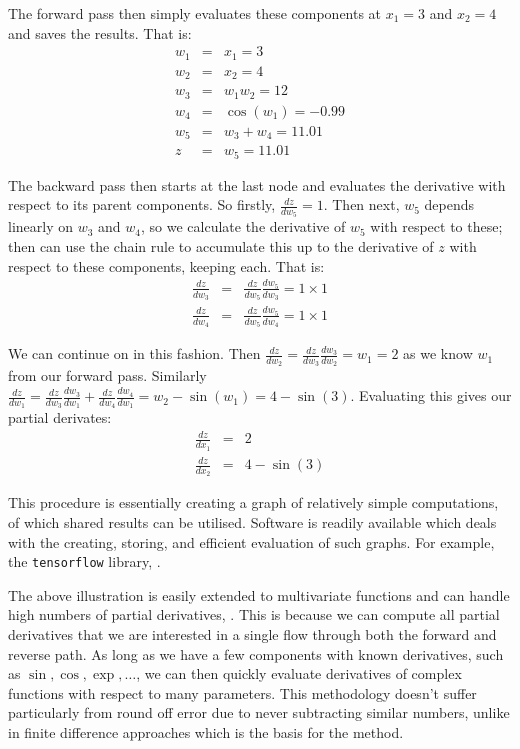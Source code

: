 The forward pass then simply evaluates these components at $x_1=3$ and $x_2=4$ and saves the results.
That is: 
\begin{eqnarray*}
	w_1 &=& x_1 = 3 \\
	w_2 &=& x_2 = 4\\
	w_3 &=& w_1 w_2 = 12 \\
	w_4 &=& \cos\left(w_1\right) = -0.99 \\
	w_5 &=& w_3 + w_4  = 11.01\\
	z &=& w_5 = 11.01
\end{eqnarray*}

The backward pass then starts at the last node and evaluates the derivative with respect to its parent components.
So firstly, $\frac{dz}{dw_5} = 1$.
Then next, $w_5$ depends linearly on $w_3$ and $w_4$, so we calculate the derivative of $w_5$ with respect to these; then can use the chain rule to accumulate this up to the derivative of $z$ with respect to these components, keeping each. 
That is:
\begin{eqnarray*}
	\frac{dz}{dw_3} &=& \frac{dz}{dw_5}\frac{dw_5}{dw_3} = 1 \times 1 \\
	\frac{dz}{dw_4} &=& \frac{dz}{dw_5}\frac{dw_5}{dw_4} = 1 \times 1
\end{eqnarray*}

We can continue on in this fashion.
Then $\frac{dz}{dw_2} = \frac{dz}{dw_3}\frac{dw_3}{dw_2} = w_1 = 2$ as we know $w_1$ from our forward pass.
Similarly $\frac{dz}{dw_1} = \frac{dz}{dw_3}\frac{dw_3}{dw_1} +  \frac{dz}{dw_4}\frac{dw_4}{dw_1}= w_2 - \sin(w_1)= 4 - \sin(3)$.
Evaluating this gives our partial derivates:
\begin{eqnarray*}
	\frac{dz}{dx_1} &=& 2 \\
	\frac{dz}{dx_2} &=& 4 - \sin(3)
\end{eqnarray*}

This procedure is essentially creating a graph of relatively simple computations, of which shared results can be utilised.
Software is readily available which deals with the creating, storing, and efficient evaluation of such graphs.
For example, the \verb*|tensorflow| library, \citep{abadi_tensorflow_2016}.

The above illustration is easily extended to multivariate functions and can handle high numbers of partial derivatives, \citep{neidinger_introduction_2010}.
This is because we can compute all partial derivatives that we are interested in a single flow through both the forward and reverse path.
As long as we have a few components with known derivatives, such as $\sin, \cos, \exp, \dots$, we can then quickly evaluate derivatives of complex functions with respect to many parameters.
This methodology doesn't suffer particularly from round off error due to never subtracting similar numbers, unlike in finite difference approaches which is the basis for the method.

